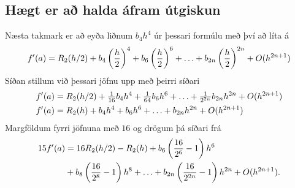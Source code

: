 \documentclass[letterpaper,10pt,icelandic]{sphinxmanual}
\begin{document}
\subsection{Hægt er að halda áfram útgiskun}
\label{kafli04:haegt-er-a-halda-afram-utgiskun}
Næsta takmark er að eyða liðnum \(b_4h^4\) úr þessari formúlu með
því að líta á
\begin{gather}
\begin{split}f'(a) = R_2(h/2) + b_4 \left(\frac{h}{2}\right)^4
  + b_6 \left(\frac{h}{2}\right)^6 + \ldots
  + b_{2n} \left(\frac{h}{2}\right)^{2n} + O(h^{2n+1})\end{split}\notag
\end{gather}
Síðan stillum við þessari jöfnu upp með þeirri síðari
\begin{gather}
\begin{split}\begin{aligned}
  f'(a) &= R_2(h/2) + \tfrac 1{16}b_4 h^4
  + \tfrac 1{64}b_6 h^6 + \ldots
  + \tfrac 1{2^{2n}}b_{2n} h^{2n} + O(h^{2n+1})\\
  f'(a) &= R_2(h) + b_4 h^4 + b_6 h^6 + \ldots + b_{2n} h^{2n}
  + O(h^{2n+1})\end{aligned}\end{split}\notag
\end{gather}
Margföldum fyrri jöfnuna með \(16\) og drögum þá síðari frá
\begin{gather}
\begin{split}\begin{aligned}
  15f'(a) &= 16 R_2(h/2) - R_2(h)
  + b_6 \left( \frac{16}{2^6} - 1 \right) h^6 \\
  &+ b_8 \left( \frac{16}{2^8} - 1 \right) h^8
  + \ldots
  + b_{2n} \left( \frac{16}{2^{2n}} - 1 \right) h^{2n}
  + O(h^{2n+1}).\end{aligned}\end{split}\notag
\end{gather}
\end{document}
